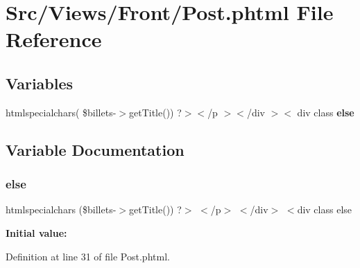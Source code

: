 \section{Src/\+Views/\+Front/\+Post.phtml File Reference}
\label{_post_8phtml}
\subsection*{Variables}
\begin{DoxyCompactItemize}
\item 
htmlspecialchars( \$billets-\/$>$get\+Title()) ?$>$$<$/p $>$$<$/div $>$$<$ div class \textbf{ else}
\end{DoxyCompactItemize}


\subsection{Variable Documentation}
\mbox{\label{_post_8phtml_a632f103aa4e8bdb5f1193ce0c4507c50}} 
\subsubsection{else}
{\footnotesize\ttfamily htmlspecialchars (\$billets-\/$>$get\+Title()) ?$>$ $<$/p$>$ $<$/div$>$ $<$div class else}

{\bfseries Initial value\+:}


Definition at line 31 of file Post.\+phtml.

